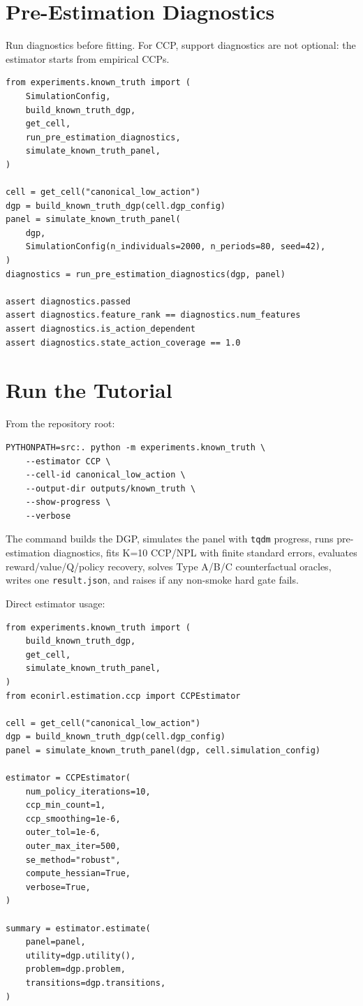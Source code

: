 \documentclass[10pt]{article}
\begin{document}
\section{Pre-Estimation Diagnostics}

Run diagnostics before fitting. For CCP, support diagnostics are not optional:
the estimator starts from empirical CCPs.

\begin{lstlisting}
from experiments.known_truth import (
    SimulationConfig,
    build_known_truth_dgp,
    get_cell,
    run_pre_estimation_diagnostics,
    simulate_known_truth_panel,
)

cell = get_cell("canonical_low_action")
dgp = build_known_truth_dgp(cell.dgp_config)
panel = simulate_known_truth_panel(
    dgp,
    SimulationConfig(n_individuals=2000, n_periods=80, seed=42),
)
diagnostics = run_pre_estimation_diagnostics(dgp, panel)

assert diagnostics.passed
assert diagnostics.feature_rank == diagnostics.num_features
assert diagnostics.is_action_dependent
assert diagnostics.state_action_coverage == 1.0
\end{lstlisting}

\section{Run the Tutorial}

From the repository root:

\begin{lstlisting}
PYTHONPATH=src:. python -m experiments.known_truth \
    --estimator CCP \
    --cell-id canonical_low_action \
    --output-dir outputs/known_truth \
    --show-progress \
    --verbose
\end{lstlisting}

The command builds the DGP, simulates the panel with \texttt{tqdm} progress,
runs pre-estimation diagnostics, fits K=10 CCP/NPL with finite standard
errors, evaluates reward/value/Q/policy recovery, solves Type A/B/C
counterfactual oracles, writes one \texttt{result.json}, and raises if any
non-smoke hard gate fails.

Direct estimator usage:

\begin{lstlisting}
from experiments.known_truth import (
    build_known_truth_dgp,
    get_cell,
    simulate_known_truth_panel,
)
from econirl.estimation.ccp import CCPEstimator

cell = get_cell("canonical_low_action")
dgp = build_known_truth_dgp(cell.dgp_config)
panel = simulate_known_truth_panel(dgp, cell.simulation_config)

estimator = CCPEstimator(
    num_policy_iterations=10,
    ccp_min_count=1,
    ccp_smoothing=1e-6,
    outer_tol=1e-6,
    outer_max_iter=500,
    se_method="robust",
    compute_hessian=True,
    verbose=True,
)

summary = estimator.estimate(
    panel=panel,
    utility=dgp.utility(),
    problem=dgp.problem,
    transitions=dgp.transitions,
)
\end{lstlisting}
\end{document}
